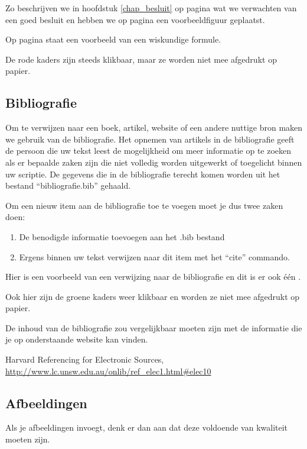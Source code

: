Zo beschrijven we in hoofdstuk \ref{chap_besluit} op pagina \pageref{chap_besluit} wat we verwachten van een goed besluit en hebben we op pagina \pageref{fig_voorbeeld1} een voorbeeldfiguur geplaatst.  

Op pagina \pageref{eq:polynoom} staat een voorbeeld van een wiskundige formule.

De rode kaders zijn steeds klikbaar, maar ze worden niet mee afgedrukt op papier.

\subsection{Bibliografie}

Om te verwijzen naar een boek, artikel, website of een andere nuttige bron maken we gebruik van de bibliografie.
Het opnemen van artikels in de bibliografie geeft de persoon die uw tekst leest de mogelijkheid om meer informatie op te zoeken als er bepaalde zaken zijn die niet volledig worden uitgewerkt of toegelicht binnen uw scriptie.
De gegevens die in de bibliografie terecht komen worden uit het bestand ``bibliografie.bib'' gehaald. 

Om een nieuw item aan de bibliografie toe te voegen moet je dus twee zaken doen:

\begin{enumerate}
 \item De benodigde informatie toevoegen aan het .bib bestand
 \item Ergens binnen uw tekst verwijzen naar dit item met het ``cite'' commando.
\end{enumerate}

Hier is een voorbeeld van een verwijzing naar de bibliografie \cite{GridCast2} en dit is er ook \'e\'en \cite{gridrm}.

Ook hier zijn de groene kaders weer klikbaar en worden ze niet mee afgedrukt op papier.

De inhoud van de bibliografie zou vergelijkbaar moeten zijn met de informatie die je op onderstaande website kan vinden.

Harvard Referencing for Electronic Sources, \url{http://www.lc.unsw.edu.au/onlib/ref_elec1.html#elec10}



\subsection{Afbeeldingen}

Als je afbeeldingen invoegt, denk er dan aan dat deze voldoende van kwaliteit moeten zijn.

